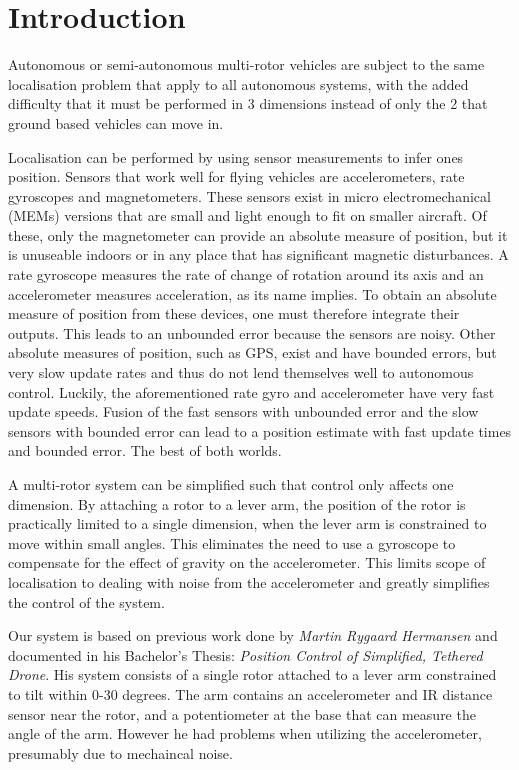 

\section*{Introduction}

Autonomous or semi-autonomous multi-rotor vehicles are subject to the 
same localisation problem that apply to all autonomous systems, with the added
difficulty that it must be performed in 3 dimensions instead of only 
the 2 that ground based vehicles can move in. 

Localisation can be performed by using sensor measurements to infer
ones position. Sensors that work well for flying vehicles are accelerometers,
rate gyroscopes and magnetometers. These sensors exist in micro electromechanical
(MEMs) versions that are small and light enough to fit on smaller aircraft.
Of these, only the magnetometer can provide
an absolute measure of position, but it is unuseable indoors or in any place
that has significant magnetic disturbances. A rate gyroscope measures the
rate of change of rotation around its axis and an accelerometer measures
acceleration, as its name implies. To obtain an absolute measure of position
from these devices, one must therefore integrate their outputs. This leads
to an unbounded error because the sensors are noisy. Other absolute measures 
of position, such as GPS, exist and have bounded errors, but very slow update
rates and thus do not lend themselves well to autonomous control. Luckily,
the aforementioned rate gyro and accelerometer have very fast update speeds.
Fusion of the fast sensors with unbounded error and the slow sensors with bounded
error can lead to a position estimate with fast update times and bounded error.
The best of both worlds.

A multi-rotor system can be simplified such that control only affects one dimension.
By attaching a rotor to a lever arm, the position of the rotor is practically limited
to a single dimension, when the lever arm is constrained to move within small angles.
This eliminates the need to use a gyroscope to compensate for the effect of gravity
on the accelerometer. This limits scope of localisation to dealing with noise
from the accelerometer and greatly simplifies the control of the system.

Our system is based on previous work done by \emph{Martin Rygaard Hermansen} and documented in his Bachelor's Thesis: \emph{Position Control of Simplified, Tethered Drone}. His system consists of a single rotor attached
to a lever arm constrained to tilt within 0-30 degrees. The arm contains an accelerometer
and IR distance sensor near the rotor, and a potentiometer at the base that can measure the angle of the arm. 
However he had problems when utilizing the accelerometer, presumably due to mechaincal noise.

